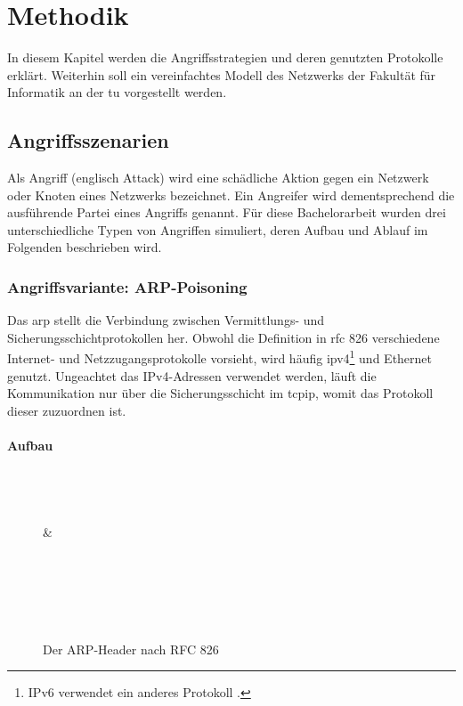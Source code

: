 \chapter{Methodik}\label{chap:methodik3}
In diesem Kapitel werden die Angriffsstrategien und deren genutzten Protokolle erklärt. Weiterhin soll ein vereinfachtes Modell des Netzwerks der Fakultät für Informatik an der \gls{tu} vorgestellt werden.

\section{Angriffsszenarien}
Als Angriff (englisch Attack) wird eine schädliche Aktion gegen ein Netzwerk oder Knoten eines Netzwerks bezeichnet. Ein Angreifer wird dementsprechend die ausführende Partei eines Angriffs genannt. Für diese Bachelorarbeit wurden drei unterschiedliche Typen von Angriffen simuliert, deren Aufbau und Ablauf im Folgenden beschrieben wird.

\subsection{Angriffsvariante: ARP-Poisoning}
Das \gls{arp} stellt die Verbindung zwischen Vermittlungs- und Sicherungsschichtprotokollen her. Obwohl die Definition in \gls{rfc} 826 \cite{RFC0826} verschiedene Internet- und Netzzugangsprotokolle vorsieht, wird häufig \gls{ipv4}\footnote{IPv6 verwendet ein anderes Protokoll \cite{RFC2461}.} und Ethernet genutzt. Ungeachtet das IPv4-Adressen verwendet werden, läuft die Kommunikation nur über die Sicherungsschicht im \gls{tcpip}, womit das Protokoll dieser zuzuordnen ist.

\subsubsection{Aufbau}
\begin{figure}[ht]
	\centering
	\begin{bytefield}[endianness=little]{16}
		 \\
		 \\
		 \\
		 &  \\
		 \\
		 \\
		 \\
		 \\
		 \\
	\end{bytefield}
	\caption{Der ARP-Header nach RFC 826 \cite{RFC0826}}
	\label{fig:arpHeader}
\end{figure}

